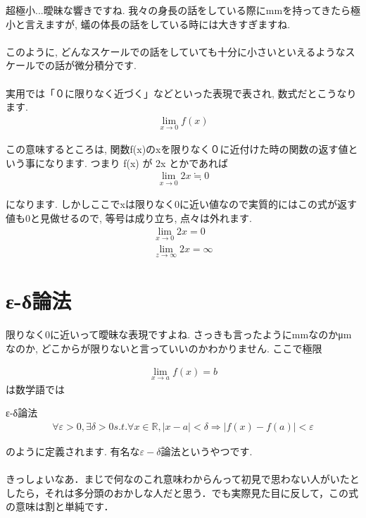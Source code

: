 \documentclass[11pt,a4paper]{ujreport}
\begin{document}
超極小...曖昧な響きですね. 我々の身長の話をしている際にmmを持ってきたら極小と言えますが, 蟻の体長の話をしている時には大きすぎますね. \\
\\

このように, どんなスケールでの話をしていても十分に小さいといえるようなスケールでの話が微分積分です.\\
\\

実用では「０に限りなく近づく」などといった表現で表され, 数式だとこうなります.
\begin{eqnarray}
\lim_{x\to0} f(x)
\end{eqnarray}

この意味するところは, 関数f(x)のxを限りなく０に近付けた時の関数の返す値という事になります. つまり f(x) が 2x とかであれば
\begin{eqnarray}
\lim_{x\to0} 2x \fallingdotseq 0
\end{eqnarray}

になります. しかしここでxは限りなく0に近い値なので実質的にはこの式が返す値も0と見做せるので, 等号は成り立ち, 点々は外れます.
\begin{eqnarray}
\lim_{x\to0} 2x = 0\\
\lim_{z\to\infty} 2x = \infty
\end{eqnarray}
\section{ε-δ論法 \label{ed}}

限りなく0に近いって曖昧な表現ですよね. さっきも言ったようにmmなのかμmなのか, どこからが限りないと言っていいのかわかりません. ここで極限


\begin{eqnarray}
\lim_{x\to a} f(x) = b
\end{eqnarray}
は数学語では


\begin{screen}
ε-δ論法
\begin{eqnarray}
\forall \varepsilon >0, \exists \delta>0  s.t.  \forall x \in \mathbb{R}, |x-a|<\delta \Rightarrow |f(x)-f(a)|<\varepsilon
\label{eq:ed}
\end{eqnarray}
\end{screen}

のように定義されます. 有名な$\varepsilon - \delta $論法というやつです.\\
\\

きっしょいなあ．まじで何なのこれ意味わからんって初見で思わない人がいたとしたら，それは多分頭のおかしな人だと思う．でも実際見た目に反して，この式の意味は割と単純です．\\
\\
\end{document}
